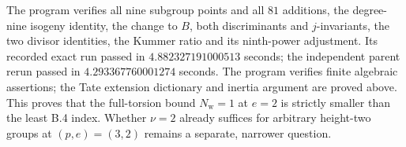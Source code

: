 \begin{remark}
The program  verifies all
nine subgroup points and all $81$ additions, the degree-nine
isogeny identity, the change to $B$, both discriminants and
$j$-invariants, the two divisor identities, the Kummer ratio and
its ninth-power adjustment. Its recorded exact run passed in
$4.882327191000513$ seconds; the independent parent rerun passed
in $4.293367760001274$ seconds. The program verifies finite
algebraic assertions; the Tate extension dictionary and inertia
argument are proved above.
This proves that the full-torsion bound $N_{\mathrm w}=1$ at
$e=2$ is strictly smaller than the least B.4 index. Whether
$\nu=2$ already suffices for arbitrary height-two groups at
$(p,e)=(3,2)$ remains a separate, narrower question.
\end{remark}
